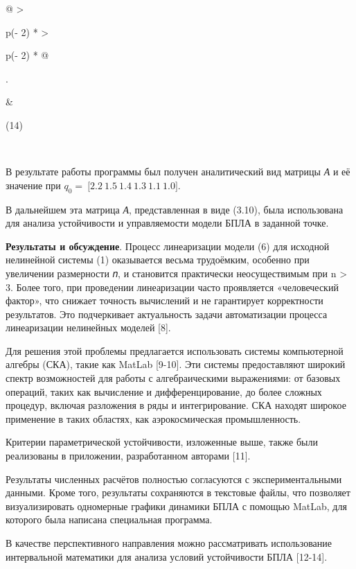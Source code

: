 \begin{longtable}[]{@{}
  >{\raggedright\arraybackslash}p{(\columnwidth - 2\tabcolsep) * }
  >{\raggedright\arraybackslash}p{(\columnwidth - 2\tabcolsep) * }@{}}
\begin{minipage}[b]{\linewidth}
\begin{pmatrix}
\begin{matrix}
\begin{matrix}
\begin{matrix}
\end{matrix}
\end{matrix}
\end{matrix}
\end{pmatrix}\).
\end{minipage} & \begin{minipage}[b]{\linewidth}\raggedright
(14)
\end{minipage} \\
\midrule\noalign{}
\endhead
\bottomrule\noalign{}
\endlastfoot
\end{longtable}

В результате работы программы был получен аналитический вид матрицы
\emph{А} и её значение при
\(q_{0} = \ \lbrack 2.2\ 1.5\ 1.4\ 1.3\ 1.1\ 1.0\rbrack\).

В дальнейшем эта матрица \emph{А}, представленная в виде (3.10), была
использована для анализа устойчивости и управляемости модели БПЛА в
заданной точке.

{\bfseries Результаты и обсуждение}. Процесс линеаризации модели (6) для
исходной нелинейной системы (1) оказывается весьма трудоёмким, особенно
при увеличении размерности 𝑛, и становится практически неосуществимым
при n \textgreater{} 3. Более того, при проведении линеаризации часто
проявляется «человеческий фактор», что снижает точность вычислений и не
гарантирует корректности результатов. Это подчеркивает актуальность
задачи автоматизации процесса линеаризации нелинейных моделей {[}8{]}.

Для решения этой проблемы предлагается использовать системы компьютерной
алгебры (СКА), такие как MatLab {[}9-10{]}. Эти системы предоставляют
широкий спектр возможностей для работы с алгебраическими выражениями: от
базовых операций, таких как вычисление и дифференцирование, до более
сложных процедур, включая разложения в ряды и интегрирование. СКА
находят широкое применение в таких областях, как аэрокосмическая
промышленность.

Критерии параметрической устойчивости, изложенные выше, также были
реализованы в приложении, разработанном авторами {[}11{]}.

Результаты численных расчётов полностью согласуются с экспериментальными
данными. Кроме того, результаты сохраняются в текстовые файлы, что
позволяет визуализировать одномерные графики динамики БПЛА с помощью
MatLab, для которого была написана специальная программа.

В качестве перспективного направления можно рассматривать использование
интервальной математики для анализа условий устойчивости БПЛА
{[}12-14{]}.


